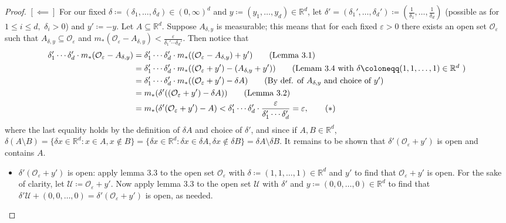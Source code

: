 \begin{proof}
\noindent \( [\impliedby ] \) For our fixed \( \delta \coloneqq (\delta_1, \hdots , \delta_d) \in (0,\infty)^{d}  \) and \( y \coloneqq (y_1, \hdots , y_d) \in \mathbb{R}^{d}  \), let \( \delta ' = (\delta_1',\hdots ,\delta_d') \coloneqq (\frac{1}{\delta_1}, \hdots ,\frac{1}{\delta _d}  ) \) (possible as for $1 \leq i \leq d,$ $\delta_i > 0$) and \( y' \coloneqq - y \). Let \( A \subseteq \mathbb{R}^{d}  \). Suppose \( A_{\delta , y}  \) is measurable; this means that for each fixed \( \varepsilon > 0 \) there exists an open set \( \mathcal{O} _\varepsilon  \) such that \( A_{\delta , y} \subseteq \mathcal{O} _\varepsilon  \) and \( m_*(\mathcal{O} _\varepsilon - A_{\delta ,y} ) < \frac{\varepsilon}{\delta_1' \cdots \delta_d'}. \) Then notice that
\begin{align}
	\delta_1'\cdots \delta_d' \cdot  m_*(\mathcal{O} _\varepsilon  - A_{\delta ,y} )  &= \delta_1'\cdots \delta_d' \cdot m_*((\mathcal{O} _\varepsilon  - A_{\delta ,y} ) + y')  \tag{Lemma 3.1} \\
							 &= \delta_1'\cdots \delta_d' \cdot m_*((\mathcal{O} _\varepsilon + y') - (A_{\delta ,y} +y')) \tag{Lemam 3.4 with \( \delta \coloneqq (1,1,\hdots ,1) \in \mathbb{R}^{d}  \) } \\
							 &= \delta_1'\cdots \delta_d' \cdot m_*((\mathcal{O}_\varepsilon  + y') - \delta A) \tag{By def. of \( A_{\delta ,y}  \) and choice of \( y' \)} \\
							 &= m_*(\delta '((\mathcal{O} _\varepsilon  + y') - \delta A)) \tag{Lemma 3.2} \\
							 &= m_*(\delta ' (\mathcal{O} _\varepsilon  + y') - A) < \delta_1'\cdots \delta_d' \cdot \frac{\varepsilon }{\delta_1'\cdots \delta_d'} = \varepsilon, \tag{$\ast$} 
\end{align}
where the last equality holds by the definition of \( \delta A  \) and choice of \( \delta ' \), and since if \( A, B \in \mathbb{R}^{d} \), \( \delta (A \setminus B) = \{ \delta x \in \mathbb{R}^{d} : x \in A, x \notin B \} = \{ \delta x  \in \mathbb{R}^{d} : \delta x \in \delta A, \delta x \notin \delta B \} =  \delta A\setminus \delta B.  \) 
It remains to be shown that \( \delta ' (\mathcal{O} _\varepsilon  + y') \) is open and contains \( A \). 
\begin{itemize}
	\item  \(\delta ' (\mathcal{O} _\varepsilon  + y')\) is open: apply lemma 3.3 to the open set \( \mathcal{O} _\varepsilon  \) with \( \delta \coloneqq (1,1, \hdots , 1) \in \mathbb{R}^{d}  \) and \( y' \) to find that \( \mathcal{O}_\varepsilon  + y' \) is open. For the sake of clarity, let \( \mathcal{U} \coloneqq \mathcal{O} _\varepsilon + y'  \). Now apply lemma 3.3 to the open set \( \mathcal{U}  \) with \( \delta ' \) and \( y \coloneqq (0,0,\hdots , 0) \in \mathbb{R}^{d}  \) to find that \( \delta ' \mathcal{U} + (0,0, \hdots , 0)  = \delta ' (\mathcal{O} _\varepsilon + y')\) is open, as needed.

\end{itemize}
\end{proof}
